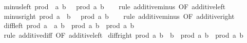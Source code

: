 \begin{isabellebody}
\isanewline
{}\isamarkupfalse%
\ minus{\isacharunderscore}{\kern0pt}left{\isacharcolon}{\kern0pt}\ {\isachardoublequoteopen}prod\ {\isacharparenleft}{\kern0pt}{\isacharminus}{\kern0pt}\ a{\isacharparenright}{\kern0pt}\ b\ {\isacharequal}{\kern0pt}\ {\isacharminus}{\kern0pt}\ prod\ a\ b{\isachardoublequoteclose}\isanewline
%
\isadelimproof
\ \ %
\endisadelimproof
%
\isatagproof
{}\isamarkupfalse%
\ {\isacharparenleft}{\kern0pt}rule\ additive{\isachardot}{\kern0pt}minus\ {\isacharbrackleft}{\kern0pt}OF\ additive{\isacharunderscore}{\kern0pt}left{\isacharbrackright}{\kern0pt}{\isacharparenright}{\kern0pt}%
\endisatagproof
{\isafoldproof}%
%
\isadelimproof
\isanewline
%
\endisadelimproof
\isanewline
{}\isamarkupfalse%
\ minus{\isacharunderscore}{\kern0pt}right{\isacharcolon}{\kern0pt}\ {\isachardoublequoteopen}prod\ a\ {\isacharparenleft}{\kern0pt}{\isacharminus}{\kern0pt}\ b{\isacharparenright}{\kern0pt}\ {\isacharequal}{\kern0pt}\ {\isacharminus}{\kern0pt}\ prod\ a\ b{\isachardoublequoteclose}\isanewline
%
\isadelimproof
\ \ %
\endisadelimproof
%
\isatagproof
{}\isamarkupfalse%
\ {\isacharparenleft}{\kern0pt}rule\ additive{\isachardot}{\kern0pt}minus\ {\isacharbrackleft}{\kern0pt}OF\ additive{\isacharunderscore}{\kern0pt}right{\isacharbrackright}{\kern0pt}{\isacharparenright}{\kern0pt}%
\endisatagproof
{\isafoldproof}%
%
\isadelimproof
\isanewline
%
\endisadelimproof
\isanewline
{}\isamarkupfalse%
\ diff{\isacharunderscore}{\kern0pt}left{\isacharcolon}{\kern0pt}\ {\isachardoublequoteopen}prod\ {\isacharparenleft}{\kern0pt}a\ {\isacharminus}{\kern0pt}\ a{\isacharprime}{\kern0pt}{\isacharparenright}{\kern0pt}\ b\ {\isacharequal}{\kern0pt}\ prod\ a\ b\ {\isacharminus}{\kern0pt}\ prod\ a{\isacharprime}{\kern0pt}\ b{\isachardoublequoteclose}\isanewline
%
\isadelimproof
\ \ %
\endisadelimproof
%
\isatagproof
{}\isamarkupfalse%
\ {\isacharparenleft}{\kern0pt}rule\ additive{\isachardot}{\kern0pt}diff\ {\isacharbrackleft}{\kern0pt}OF\ additive{\isacharunderscore}{\kern0pt}left{\isacharbrackright}{\kern0pt}{\isacharparenright}{\kern0pt}%
\endisatagproof
{\isafoldproof}%
%
\isadelimproof
\isanewline
%
\endisadelimproof
\isanewline
{}\isamarkupfalse%
\ diff{\isacharunderscore}{\kern0pt}right{\isacharcolon}{\kern0pt}\ {\isachardoublequoteopen}prod\ a\ {\isacharparenleft}{\kern0pt}b\ {\isacharminus}{\kern0pt}\ b{\isacharprime}{\kern0pt}{\isacharparenright}{\kern0pt}\ {\isacharequal}{\kern0pt}\ prod\ a\ b\ {\isacharminus}{\kern0pt}\ prod\ a\ b{\isacharprime}{\kern0pt}{\isachardoublequoteclose}\isanewline

\end{isabellebody}
